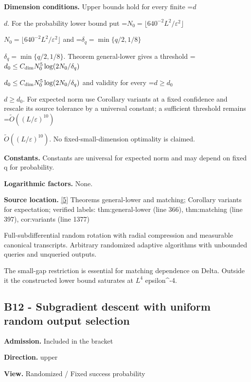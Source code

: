 \documentclass[10pt,a4paper]{article}
\newcommand{\AtlasMath}[1]{\par\begingroup\centering\setbox0=\hbox{$\displaystyle #1$}\ifdim\wd0>1.4\linewidth\typeout{ATLAS WIDE FORMULA: \the\wd0}\fi\ifdim\wd0>\linewidth\resizebox{\linewidth}{!}{\box0}\else\box0\fi\par\endgroup}
\newcommand{\AtlasInlineMath}[1]{\begingroup\setbox0=\hbox{$#1$}\ifdim\wd0>.4\linewidth\endgroup\AtlasMath{#1}\else\endgroup$#1$\fi}
\begin{document}
\textbf{Dimension conditions.} Upper bounds hold for every finite \AtlasInlineMath{d}. For the probability lower bound put \AtlasInlineMath{N_0=\lfloor640^{-2}L^2/\varepsilon^2\rfloor} and \AtlasInlineMath{\delta_q=\min\{q/2,1/8\}}. Theorem general-lower gives a threshold \AtlasInlineMath{d_0\le C_{\rm dim}N_0^5\log(2N_0/\delta_q)} and validity for every \AtlasInlineMath{d\ge d_0}. For expected norm use Corollary variants at a fixed confidence and rescale its source tolerance by a universal constant; a sufficient threshold remains \AtlasInlineMath{\widetilde O((L/\varepsilon)^{10})}. No fixed-small-dimension optimality is claimed.



\textbf{Constants.} Constants are universal for expected norm and may depend on fixed q for probability.



\textbf{Logarithmic factors.} None.



\textbf{Source location.} \href{https://github.com/WU-Wendao/Colombo/blob/main/colombo_sensorium/Complexity_altas/data/sources/colombo/N01/manuscript.pdf}{[5]} Theorems general-lower and matching; Corollary variants for expectation; verified labels: thm:general-lower (line 366), thm:matching (line 397), cor:variants (line 1377)



Full-subdifferential random rotation with radial compression and measurable canonical transcripts. Arbitrary randomized adaptive algorithms with unbounded queries and unqueried outputs.



The small-gap restriction is essential for matching dependence on Delta. Outside it the constructed lower bound saturates at $L^4$ epsilon\textasciicircum{}-4.



\subsection{B12 - Subgradient descent with uniform random output selection}


\textbf{Admission.} Included in the bracket



\textbf{Direction.} upper



\textbf{View.} Randomized / Fixed success probability
\end{document}
